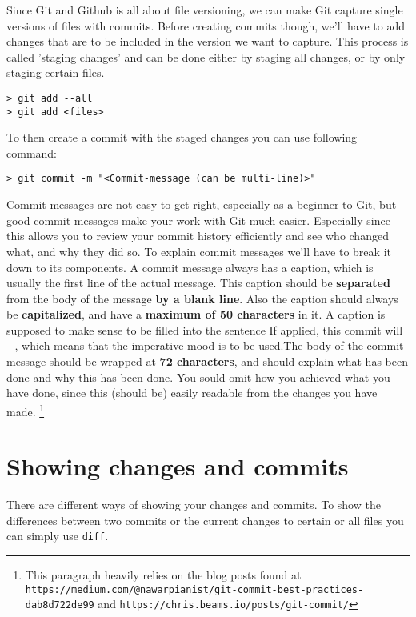 \documentclass[a4paper, 12pt]{article}
\begin{document}
		Since Git and Github is all about file versioning, we can make Git capture single versions of files with commits. Before creating commits though, we'll have to add changes that are to be included in the version we want to capture. This process is called 'staging changes' and can be done either by staging all changes, or by only staging certain files.
		
		\begin{lstlisting}
> git add --all
> git add <files>
		\end{lstlisting}
		
		To then create a commit with the staged changes you can use following command:
		
		\begin{lstlisting}
> git commit -m "<Commit-message (can be multi-line)>"
		\end{lstlisting}
		\newpage
		
		Commit-messages are not easy to get right, especially as a beginner to Git, but good commit messages make your work with Git much easier. Especially since this allows you to review your commit history efficiently and see who changed what, and why they did so. To explain commit messages we'll have to break it down to its components. A commit message always has a caption, which is usually the first line of the actual message. This caption should be \textbf{separated} from the body of the message \textbf{by a blank line}. Also the caption should always be \textbf{capitalized}, and have a \textbf{maximum of 50 characters} in it. A caption is supposed to make sense to be filled into the sentence \glqq If applied, this commit will \_\grqq, which means that the imperative mood is to be used.The body of the commit message should be wrapped at \textbf{72 characters}, and should explain what has been done and why this has been done. You sould omit how you achieved what you have done, since this (should be) easily readable from the changes you have made. \footnote{This paragraph heavily relies on the blog posts found at \lstinline|https://medium.com/@nawarpianist/git-commit-best-practices-dab8d722de99| and \lstinline|https://chris.beams.io/posts/git-commit/|}
		
	\section{Showing changes and commits}
		
		There are different ways of showing your changes and commits. To show the differences between two commits or the current changes to certain or all files you can simply use \lstinline|diff|.
		
\end{document}
